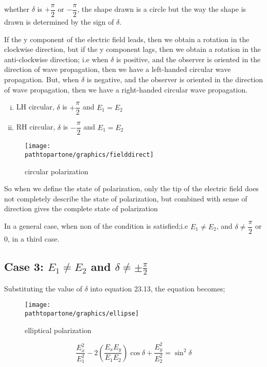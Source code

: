 whether  $\delta$ is $+\dfrac{\pi}{2}$  or  $-\dfrac{\pi}{2} $, the shape drawn is a circle but the way the shape is drawn is determined by the sign of $\delta$.

If the y component of the electric field leads, then we obtain a rotation in the clockwise direction, but if the y component lags, then we obtain a rotation in the anti-clockwise direction; i.e when $\delta$ is positive, and the observer is oriented in the direction of wave propagation, then we have a left-handed circular wave propagation. But, when $\delta$ is negative, and the observer is oriented in the direction of wave propagation, then we have a right-handed circular wave propagation.
\begin{enumerate}[(i)]
\item LH circular, $\delta$ is $ +\dfrac{\pi}{2}$ and $ E_1 = E_2$
\item RH circular, $\delta$ is $-\dfrac{\pi}{2}$ and $ E_1 = E_2$ 
\end{enumerate}
\begin{figure}[h]
\centering
\texttt{[image: \\pathtopartone/graphics/fielddirect]}
\caption{circular polarization}
\end{figure} 

So when we define the state of polarization, only the tip of the electric field does not completely describe the state of polarization, but combined with sense of direction gives the complete state of polarization

In a general case, when non of the condition is satisfied;i.e $ E_1 \neq E_2$, and $\delta\neq\dfrac{\pi}{2}$ or $ 0 $, in a third case.

\subsection{Case 3: \texorpdfstring{$E_1\neq E_2$}{E1≠E2} and \texorpdfstring{$\delta\neq\pm\frac{\pi}{2}$}{δ≠𝜆/2}}
Substituting the value of $\delta$ into equation 23.13, the equation becomes;
\begin{figure}[h]
\centering
\texttt{[image: \\pathtopartone/graphics/ellipse]}
\caption{elliptical polarization}
\end{figure}

\begin{equation}
\frac{E_{x}^2}{E_{1}^2} -2(\frac{E_{x}E_{y}}{E_{1}E_{2}})\cos\delta + \frac{E_{y}^2}{E_{2}^2} =\sin^2 \delta
\end{equation}

